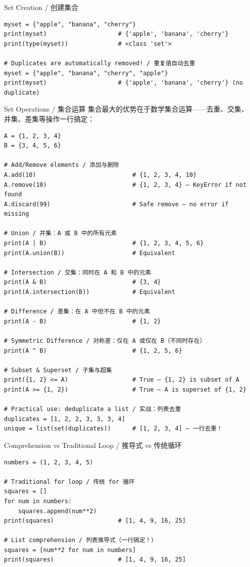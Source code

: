 \documentclass[11pt,a4paper]{report}
\begin{document}
\begin{examplebox}{Set Creation / 创建集合}
\begin{lstlisting}
myset = {"apple", "banana", "cherry"}
print(myset)                    # {'apple', 'banana', 'cherry'}
print(type(myset))              # <class 'set'>

# Duplicates are automatically removed! / 重复值自动去重
myset = {"apple", "banana", "cherry", "apple"}
print(myset)                    # {'apple', 'banana', 'cherry'} (no duplicate)
\end{lstlisting}
\end{examplebox}

\begin{examplebox}{Set Operations / 集合运算}
    集合最大的优势在于数学集合运算——去重、交集、并集、差集等操作一行搞定：
\begin{lstlisting}
A = {1, 2, 3, 4}
B = {3, 4, 5, 6}

# Add/Remove elements / 添加与删除
A.add(10)                           # {1, 2, 3, 4, 10}
A.remove(10)                        # {1, 2, 3, 4} — KeyError if not found
A.discard(99)                       # Safe remove — no error if missing

# Union / 并集：A 或 B 中的所有元素
print(A | B)                        # {1, 2, 3, 4, 5, 6}
print(A.union(B))                   # Equivalent

# Intersection / 交集：同时在 A 和 B 中的元素
print(A & B)                        # {3, 4}
print(A.intersection(B))            # Equivalent

# Difference / 差集：在 A 中但不在 B 中的元素
print(A - B)                        # {1, 2}

# Symmetric Difference / 对称差：仅在 A 或仅在 B（不同时存在）
print(A ^ B)                        # {1, 2, 5, 6}

# Subset & Superset / 子集与超集
print({1, 2} <= A)                  # True — {1, 2} is subset of A
print(A >= {1, 2})                  # True — A is superset of {1, 2}

# Practical use: deduplicate a list / 实战：列表去重
duplicates = [1, 2, 2, 3, 3, 3, 4]
unique = list(set(duplicates))      # [1, 2, 3, 4] — 一行去重！
\end{lstlisting}
\end{examplebox}

\begin{examplebox}{Comprehension vs Traditional Loop / 推导式 vs 传统循环}
\begin{lstlisting}
numbers = (1, 2, 3, 4, 5)

# Traditional for loop / 传统 for 循环
squares = []
for num in numbers:
    squares.append(num**2)
print(squares)                  # [1, 4, 9, 16, 25]

# List comprehension / 列表推导式（一行搞定！）
squares = [num**2 for num in numbers]
print(squares)                  # [1, 4, 9, 16, 25]
\end{lstlisting}
\end{examplebox}
\end{document}
